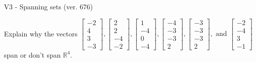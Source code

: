 \begin{exercise}
  \begin{exerciseTitle}V3 - Spanning sets (ver. 676)\end{exerciseTitle}
  \begin{exerciseStatement}
    Explain why the vectors \(\left[\begin{array}{r}
-2 \\
4 \\
3 \\
-3
\end{array}\right] , \left[\begin{array}{r}
2 \\
2 \\
-4 \\
-2
\end{array}\right] , \left[\begin{array}{r}
1 \\
-4 \\
0 \\
-4
\end{array}\right] , \left[\begin{array}{r}
-4 \\
-3 \\
-3 \\
2
\end{array}\right] , \left[\begin{array}{r}
-3 \\
-3 \\
-3 \\
2
\end{array}\right] , \text{ and } \left[\begin{array}{r}
-2 \\
-4 \\
3 \\
-1
\end{array}\right]\) span or don't span \(\mathbb{R}^4\). 
	



\end{exerciseStatement}
\end{exercise}

